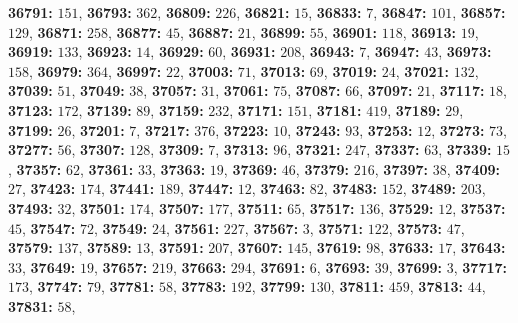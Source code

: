 \textsf{\bfseries 36791:} $151$, \textsf{\bfseries 36793:} $362$, \textsf{\bfseries 36809:} $226$, \textsf{\bfseries 36821:} $15$, \textsf{\bfseries 36833:} $7$, \textsf{\bfseries 36847:} $101$, \textsf{\bfseries 36857:} $129$, \textsf{\bfseries 36871:} $258$, \textsf{\bfseries 36877:} $45$, \textsf{\bfseries 36887:} $21$, \textsf{\bfseries 36899:} $55$, \textsf{\bfseries 36901:} $118$, \textsf{\bfseries 36913:} $19$, \textsf{\bfseries 36919:} $133$, \textsf{\bfseries 36923:} $14$, \textsf{\bfseries 36929:} $60$, \textsf{\bfseries 36931:} $208$, \textsf{\bfseries 36943:} $7$, \textsf{\bfseries 36947:} $43$, \textsf{\bfseries 36973:} $158$, \textsf{\bfseries 36979:} $364$, \textsf{\bfseries 36997:} $22$, \textsf{\bfseries 37003:} $71$, \textsf{\bfseries 37013:} $69$, \textsf{\bfseries 37019:} $24$, \textsf{\bfseries 37021:} $132$, \textsf{\bfseries 37039:} $51$, \textsf{\bfseries 37049:} $38$, \textsf{\bfseries 37057:} $31$, \textsf{\bfseries 37061:} $75$, \textsf{\bfseries 37087:} $66$, \textsf{\bfseries 37097:} $21$, \textsf{\bfseries 37117:} $18$, \textsf{\bfseries 37123:} $172$, \textsf{\bfseries 37139:} $89$, \textsf{\bfseries 37159:} $232$, \textsf{\bfseries 37171:} $151$, \textsf{\bfseries 37181:} $419$, \textsf{\bfseries 37189:} $29$, \textsf{\bfseries 37199:} $26$, \textsf{\bfseries 37201:} $7$, \textsf{\bfseries 37217:} $376$, \textsf{\bfseries 37223:} $10$, \textsf{\bfseries 37243:} $93$, \textsf{\bfseries 37253:} $12$, \textsf{\bfseries 37273:} $73$, \textsf{\bfseries 37277:} $56$, \textsf{\bfseries 37307:} $128$, \textsf{\bfseries 37309:} $7$, \textsf{\bfseries 37313:} $96$, \textsf{\bfseries 37321:} $247$, \textsf{\bfseries 37337:} $63$, \textsf{\bfseries 37339:} $15$, \textsf{\bfseries 37357:} $62$, \textsf{\bfseries 37361:} $33$, \textsf{\bfseries 37363:} $19$, \textsf{\bfseries 37369:} $46$, \textsf{\bfseries 37379:} $216$, \textsf{\bfseries 37397:} $38$, \textsf{\bfseries 37409:} $27$, \textsf{\bfseries 37423:} $174$, \textsf{\bfseries 37441:} $189$, \textsf{\bfseries 37447:} $12$, \textsf{\bfseries 37463:} $82$, \textsf{\bfseries 37483:} $152$, \textsf{\bfseries 37489:} $203$, \textsf{\bfseries 37493:} $32$, \textsf{\bfseries 37501:} $174$, \textsf{\bfseries 37507:} $177$, \textsf{\bfseries 37511:} $65$, \textsf{\bfseries 37517:} $136$, \textsf{\bfseries 37529:} $12$, \textsf{\bfseries 37537:} $45$, \textsf{\bfseries 37547:} $72$, \textsf{\bfseries 37549:} $24$, \textsf{\bfseries 37561:} $227$, \textsf{\bfseries 37567:} $3$, \textsf{\bfseries 37571:} $122$, \textsf{\bfseries 37573:} $47$, \textsf{\bfseries 37579:} $137$, \textsf{\bfseries 37589:} $13$, \textsf{\bfseries 37591:} $207$, \textsf{\bfseries 37607:} $145$, \textsf{\bfseries 37619:} $98$, \textsf{\bfseries 37633:} $17$, \textsf{\bfseries 37643:} $33$, \textsf{\bfseries 37649:} $19$, \textsf{\bfseries 37657:} $219$, \textsf{\bfseries 37663:} $294$, \textsf{\bfseries 37691:} $6$, \textsf{\bfseries 37693:} $39$, \textsf{\bfseries 37699:} $3$, \textsf{\bfseries 37717:} $173$, \textsf{\bfseries 37747:} $79$, \textsf{\bfseries 37781:} $58$, \textsf{\bfseries 37783:} $192$, \textsf{\bfseries 37799:} $130$, \textsf{\bfseries 37811:} $459$, \textsf{\bfseries 37813:} $44$, \textsf{\bfseries 37831:} $58$, 
